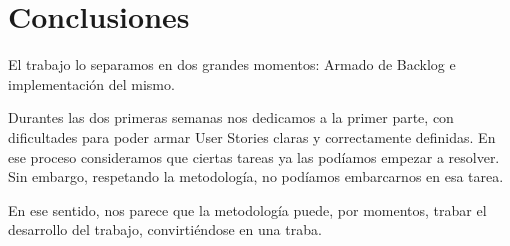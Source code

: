 \section{Conclusiones}

El trabajo lo separamos en dos grandes momentos: Armado de Backlog e implementación del mismo.

Durantes las dos primeras semanas nos dedicamos a la primer parte, con dificultades para poder armar User Stories claras y correctamente definidas. En ese proceso consideramos que ciertas tareas ya las podíamos empezar a resolver. Sin embargo, respetando la metodología, no podíamos embarcarnos en esa tarea.

En ese sentido, nos parece que la metodología puede, por momentos, trabar el desarrollo del trabajo, convirtiéndose en una traba.
